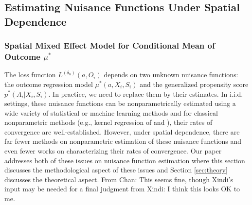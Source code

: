 \documentclass[12pt]{article}
\newcommand{\CP}[1]{{\color{purple}From Chan: #1}}
\newcommand{\XL}[1]{{\color{blue}from Xindi: #1}}
\begin{document}
\subsection{Estimating Nuisance Functions Under Spatial Dependence} \label{sec:nuisance}
\subsubsection{Spatial Mixed Effect Model for Conditional Mean of Outcome $\mu^*$}

The loss function $L^{({\delta_n})}(a, O_i)$ depends on two unknown nuisance functions: the outcome regression model $\mu^*(a,X_i,S_i)$ and the generalized propensity score $p^*(A_i|X_i,S_i)$. In practice, we need to replace them by their estimates. In i.i.d. settings, these nuisance functions can be nonparametrically estimated using a wide variety of statistical or machine learning methods and for classical nonparametric methods (e.g., kernel regression of \citet{Nadaraya1964} and \citet{Watson1964}), their rates of convergence are well-established. However, under spatial dependence, there are far fewer methods on nonparametric estimation of these nuisance functions and even fewer works on characterizing their rates of convergence. Our paper addresses both of these issues on nuisance function estimation where this section discusses the methodological aspect of these issues and Section \ref{sec:theory} discusses the theoretical aspect. \CP{This seems fine, though Xindi’s input may be needed for a final judgment} \XL{I think this looks OK to me.}


\end{document}
